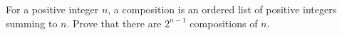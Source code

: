 For a positive integer $n$, a composition is an ordered list of positive integers summing to $n$. Prove that there are $2^{n-1}$ compositions of $n$.
